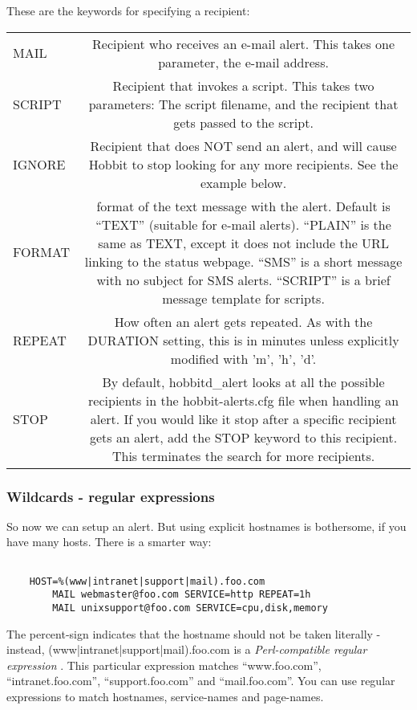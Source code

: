  These are the keywords for specifying a recipient:


\begin{tabular}{lc}
MAIL &Recipient who receives an e-mail alert. This takes one parameter, the e-mail address. \\
SCRIPT &Recipient that invokes a script. This takes two parameters: The script filename, and the recipient that gets passed to the script. \\
IGNORE &Recipient that does NOT send an alert, and will cause Hobbit to stop looking for any more recipients. See the example below. \\
FORMAT &format of the text message with the alert. Default is ``TEXT'' (suitable for e-mail alerts). ``PLAIN'' is the same as TEXT, except it does not include the URL linking to the status webpage. ``SMS'' is a short message with no subject for SMS alerts. ``SCRIPT'' is a brief message template for scripts. \\
REPEAT &How often an alert gets repeated. As with the DURATION setting, this is in minutes unless explicitly modified with 'm', 'h', 'd'. \\
STOP &By default, hobbitd\_alert looks at all the possible recipients in the hobbit-alerts.cfg file when handling an alert. If you would like it stop after a specific recipient gets an alert, add the STOP keyword to this recipient. This terminates the search for more recipients.

\end{tabular}

\subsubsection*{Wildcards - regular expressions}


 So now we can setup an alert. But using explicit hostnames is bothersome, if you have many hosts. There is a smarter way: \begin{verbatim}

	HOST=%(www|intranet|support|mail).foo.com
		MAIL webmaster@foo.com SERVICE=http REPEAT=1h
		MAIL unixsupport@foo.com SERVICE=cpu,disk,memory

\end{verbatim}



 The percent-sign indicates that the hostname should not be taken literally - instead, (www|intranet|support|mail).foo.com is a \emph{Perl-compatible regular expression}
. This particular expression matches ``www.foo.com'', ``intranet.foo.com'', ``support.foo.com'' and ``mail.foo.com''. You can use regular expressions to match hostnames, service-names and page-names.


